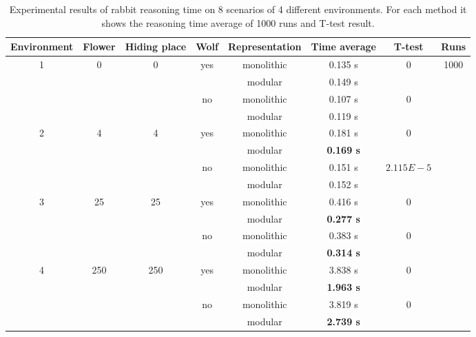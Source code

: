 \documentclass{aamas2012}
\begin{document}
	\begin{table}
		\label{experiment_results}
		\centering
		\begin{tabular}{ | c | c | c | c | c | c | c | c | }
		\hline
		Environment & Flower & Hiding place & Wolf & Representation & Time average & T-test & Runs\\	
		\hline
	 	\multirow{4}{*}{1} & \multirow{4}{*}{0} & \multirow{4}{*}{0} & \multirow{2}{*}{yes} & monolithic & 0.135 s & \multirow{2}{*}{0} & \multirow{16}{*}{1000} \\
		& & & & modular & 0.149 s & & \\ \cline{4-7}
		& & & \multirow{2}{*}{no} & monolithic & 0.107 s & \multirow{2}{*}{0} & \\
		& & & & modular & 0.119 s & & \\ \cline{1-7}
		\multirow{4}{*}{2} & \multirow{4}{*}{4} & \multirow{4}{*}{4} & \multirow{2}{*}{yes} & monolithic & 0.181 s & \multirow{2}{*}{0} & \\
		& & & & modular & \textbf{0.169 s} & & \\ \cline{4-7}
		& & & \multirow{2}{*}{no} & monolithic & 0.151 s & \multirow{2}{*}{$2.115E-5$} & \\
		& & & & modular & 0.152 s & & \\ \cline{1-7}
		\multirow{4}{*}{3} & \multirow{4}{*}{25} & \multirow{4}{*}{25} & \multirow{2}{*}{yes} & monolithic & 0.416 s & \multirow{2}{*}{0} & \\
		& & & & modular & \textbf{0.277 s} & & \\ \cline{4-7}
		& & & \multirow{2}{*}{no} & monolithic & 0.383 s & \multirow{2}{*}{0} & \\
		& & & & modular & \textbf{0.314 s} & & \\ \cline{1-7}
		\multirow{4}{*}{4} & \multirow{4}{*}{250} & \multirow{4}{*}{250} & \multirow{2}{*}{yes} & monolithic & 3.838 s & \multirow{2}{*}{0} & \\
		& & & & modular & \textbf{1.963 s} & & \\ \cline{4-7}
		& & &  \multirow{2}{*}{no} & monolithic & 3.819 s & \multirow{2}{*}{0} & \\
		& & & & modular & \textbf{2.739 s} & & \\ \cline{1-7}
		\hline
		\end{tabular}
		\caption
		{
			Experimental results of rabbit reasoning time on 8 scenarios of 4 different environments.
			For each method it shows the reasoning time average of 1000 runs and T-test result.
		}
	\end{table}
\end{document}
